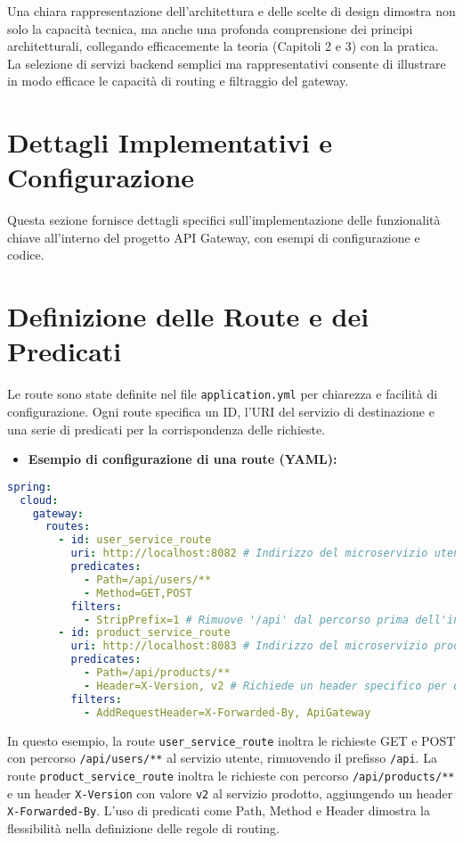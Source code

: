 Una chiara rappresentazione dell'architettura e delle scelte di design dimostra non solo la capacità tecnica, ma anche una profonda comprensione dei principi architetturali, collegando efficacemente la teoria (Capitoli 2 e 3) con la pratica. La selezione di servizi backend semplici ma rappresentativi consente di illustrare in modo efficace le capacità di routing e filtraggio del gateway.

\section{Dettagli Implementativi e Configurazione}

Questa sezione fornisce dettagli specifici sull'implementazione delle funzionalità chiave all'interno del progetto API Gateway, con esempi di configurazione e codice.

\section{Definizione delle Route e dei Predicati}

Le route sono state definite nel file \texttt{application.yml} per chiarezza e facilità di configurazione. Ogni route specifica un ID, l'URI del servizio di destinazione e una serie di predicati per la corrispondenza delle richieste.
\begin{itemize}
    \item \textbf{Esempio di configurazione di una route (YAML):}
\end{itemize}
\begin{lstlisting}[language=yaml, caption=Configurazione YAML delle route]
spring:
  cloud:
    gateway:
      routes:
        - id: user_service_route
          uri: http://localhost:8082 # Indirizzo del microservizio utente
          predicates:
            - Path=/api/users/**
            - Method=GET,POST
          filters:
            - StripPrefix=1 # Rimuove '/api' dal percorso prima dell'inoltro
        - id: product_service_route
          uri: http://localhost:8083 # Indirizzo del microservizio prodotto
          predicates:
            - Path=/api/products/**
            - Header=X-Version, v2 # Richiede un header specifico per questa route
          filters:
            - AddRequestHeader=X-Forwarded-By, ApiGateway
\end{lstlisting}
In questo esempio, la route \texttt{user\_service\_route} inoltra le richieste GET e POST con percorso \texttt{/api/users/**} al servizio utente, rimuovendo il prefisso \texttt{/api}. La route \texttt{product\_service\_route} inoltra le richieste con percorso \texttt{/api/products/**} e un header \texttt{X-Version} con valore \texttt{v2} al servizio prodotto, aggiungendo un header \texttt{X-Forwarded-By}. L'uso di predicati come Path, Method e Header dimostra la flessibilità nella definizione delle regole di routing.

